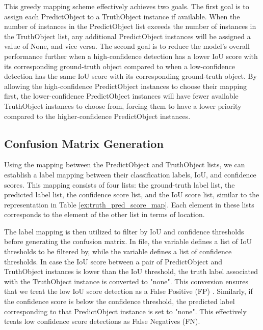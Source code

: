 This greedy mapping scheme effectively achieves two goals. The first goal is to assign each PredictObject to a  TruthObject instance if available. When the number of instances in the PredictObject list exceeds the number of instances in the TruthObject list, any additional PredictObject instances will be assigned a value of None, and vice versa. The second goal is to reduce the model's overall performance further when a high-confidence detection has a lower IoU score with its corresponding ground-truth object compared to when a low-confidence detection has the same IoU score with its corresponding ground-truth object. By allowing the high-confidence PredictObject instances to choose their mapping first, the lower-confidence PredictObject instances will have fewer available TruthObject instances to choose from, forcing them to have a lower priority compared to the higher-confidence PredictObject instances.

\subsection{Confusion Matrix Generation}
Using the mapping between the PredictObject and TruthObject lists, we can establish a label mapping between their classification labels, IoU, and confidence scores. This mapping consists of four lists: the ground-truth label list, the predicted label list, the confidence score list, and the IoU score list, similar to the representation in Table \ref{ex:truth_pred_score_map}. Each element in these lists corresponds to the element of the other list in terms of location. 

The label mapping is then utilized to filter by IoU and confidence thresholds before generating the confusion matrix. In  file, the  variable defines a list of IoU thresholds to be filtered by, while the  variable defines a list of confidence thresholds. In case the IoU score between a pair of PredictObject and TruthObject instances is lower than the IoU threshold, the truth label associated with the TruthObject instance is converted to "none". This conversion ensures that we treat the low IoU score detection as a False Positive (FP) \cite{metrics_survey_2020}. Similarly, if the confidence score is below the confidence threshold, the predicted label corresponding to that PredictObject instance is set to "none". This effectively treats low confidence score detections as False Negatives (FN).

